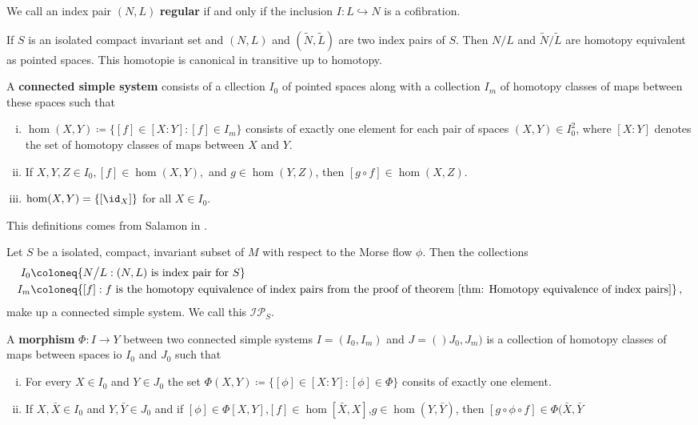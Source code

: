 \begin{definition}
	We call an index pair $(N,L)$ \textbf{regular} if and only if the inclusion $I: L \hookrightarrow N$ is a cofibration.
\end{definition}
\begin{theorem} \label{thm: Homotopy equivalence of index pairs}
	If $S$ is an isolated compact invariant set and $(N,L)$ and $(\tilde{N},\tilde{L})$ are two index pairs of $S$. Then $N/L$ and $\tilde{N}/\tilde{L}$ are homotopy equivalent as pointed spaces. This homotopie is canonical in transitive up to homotopy. 
\end{theorem}
\begin{definition}
	A \textbf{connected simple system} consists of a cllection $I_0$ of pointed spaces along with a collection $I_m$ of homotopy classes of maps between these spaces such that 
	\begin{enumerate}[(i)]
		\item $\hom(X,Y)\coloneq \{[f]\in [X:Y]:[f]\in I_m\}$ consists of exactly one element for each pair of spaces $(X,Y)\in I_0^2$, where $[X:Y]$ denotes the set of homotopy classes of maps between $X$ and $Y$.
		\item If $X,Y,Z\in I_0,[f]\in \hom(X,Y),$ and $g\in \hom(Y,Z)$, then $[g\circ f]\in \hom(X,Z)$.
		\item $\hom(X,Y)=\{[\id_X]\}$ for all $X\in I_0$. 
	\end{enumerate}
\end{definition}
\begin{remark}
	This definitions comes from Salamon in \cite{Salamon1985}.
\end{remark}
\begin{remark} Let $S$ be a isolated, compact, invariant subset of $M$ with respect to the Morse flow $\phi$. Then the collections
	\begin{align*}
		I_0&\coloneq \{N\big/ L: (N,L)\text{ is index pair for }S\}\\
		I_m&\coloneq \{[f]: f \text{ is the homotopy equivalence of index pairs from the proof of theorem \ref{thm: Homotopy equivalence of index pairs}}\}\,,
	\end{align*} make up a connected simple system. We call this $\mathcal{IP}_S$.
\end{remark}
\begin{definition}
	A \textbf{morphism} $\Phi:I\to Y$ between two connected simple systems $I=(I_0,I_m)$ and $J=()J_0,J_m)$ is a collection of homotopy classes of maps between spaces io $I_0$ and $J_0$ such that
	\begin{enumerate}[(i)]
		\item For every $X\in I_0$ and $Y\in J_0$ the set $\Phi(X,Y)\coloneq \{[\phi]\in [X:Y]:[\phi]\in \Phi\}$ consits of exactly one element. 
		\item If $X,\bar{X}\in I_0$ and $Y,\bar{Y}\in J_0$ and if $[\phi]\in \Phi[X,Y]$,$[f]\in \hom[\bar{X},X]$,$g\in \hom(Y,\bar{Y})$, then $[g\circ \phi\circ f]\in \Phi(\bar{X},\bar{Y}$
	\end{enumerate}
\end{definition}
